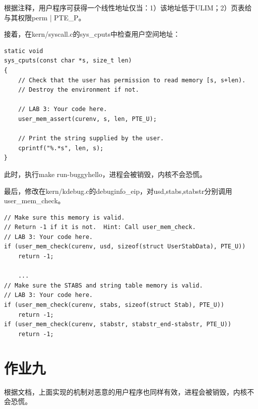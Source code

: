 \documentclass[12pt,a4paper,UTF8]{article}
\begin{document}
        根据注释，用户程序可获得一个线性地址仅当：1）该地址低于ULIM；2）页表给与其权限perm | PTE\_P。

        接着，在kern/syscall.c的sys\_cputs中检查用户空间地址：

    \begin{lstlisting}[style=CPP]
static void
sys_cputs(const char *s, size_t len)
{
    // Check that the user has permission to read memory [s, s+len).
    // Destroy the environment if not.

    // LAB 3: Your code here.
    user_mem_assert(curenv, s, len, PTE_U);

    // Print the string supplied by the user.
    cprintf("%.*s", len, s);
}
    \end{lstlisting}
        
        此时，执行make run-buggyhello，进程会被销毁，内核不会恐慌。

        最后，修改在kern/kdebug.c的debuginfo\_eip，对usd,stabs,stabstr分别调用user\_mem\_check。

    \begin{lstlisting}[style=CPP]
// Make sure this memory is valid.
// Return -1 if it is not.  Hint: Call user_mem_check.
// LAB 3: Your code here.
if (user_mem_check(curenv, usd, sizeof(struct UserStabData), PTE_U))
    return -1;

    ...
// Make sure the STABS and string table memory is valid.
// LAB 3: Your code here.
if (user_mem_check(curenv, stabs, sizeof(struct Stab), PTE_U))
    return -1;
if (user_mem_check(curenv, stabstr, stabstr_end-stabstr, PTE_U))
    return -1;
    \end{lstlisting}

\section{作业九}
    根据文档，上面实现的机制对恶意的用户程序也同样有效，进程会被销毁，内核不会恐慌。
\end{document}
